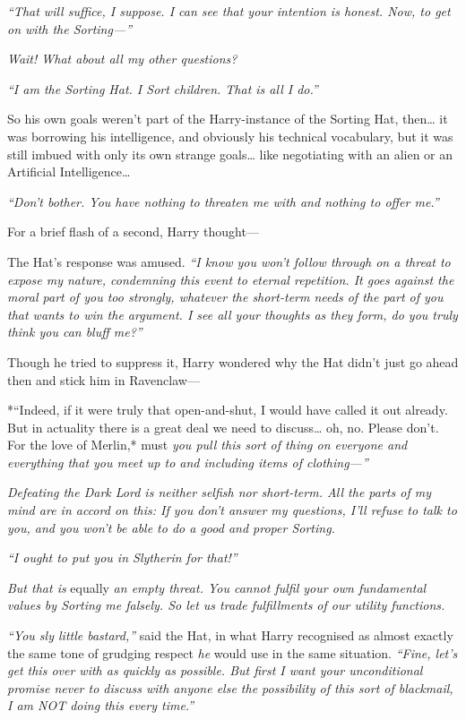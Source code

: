 \emph{``That will suffice, I suppose. I can see that your intention is
honest. Now, to get on with the Sorting---''}

\emph{Wait! What about all my other questions?}

\emph{``I am the Sorting Hat. I Sort children. That is all I do.''}

So his own goals weren't part of the Harry-instance of the Sorting Hat,
then\ldots{} it was borrowing his intelligence, and obviously his
technical vocabulary, but it was still imbued with only its own strange
goals\ldots{} like negotiating with an alien or an Artificial
Intelligence\ldots{}

\emph{``Don't bother. You have nothing to threaten me with and nothing
to offer me.''}

For a brief flash of a second, Harry thought---

The Hat's response was amused. \emph{``I know you won't follow through
on a threat to expose my nature, condemning this event to eternal
repetition. It goes against the moral part of you too strongly, whatever
the short-term needs of the part of you that wants to win the argument.
I see all your thoughts as they form, do you truly think you can bluff
me?''}

Though he tried to suppress it, Harry wondered why the Hat didn't just
go ahead then and stick him in Ravenclaw---

*``Indeed, if it were truly that open-and-shut, I would have called it
out already. But in actuality there is a great deal we need to
discuss\ldots{} oh, no. Please don't. For the love of Merlin,* must
\emph{you pull this sort of thing on everyone and everything that you
meet up to and including items of clothing---''}

\emph{Defeating the Dark Lord is neither selfish nor short-term. All the
parts of my mind are in accord on this: If you don't answer my
questions, I'll refuse to talk to you, and you won't be able to do a
good and proper Sorting.}

\emph{``I ought to put you in Slytherin for that!''}

\emph{But that is} equally \emph{an empty threat. You cannot fulfil your
own fundamental values by Sorting me falsely. So let us trade
fulfillments of our utility functions.}

\emph{``You sly little bastard,''} said the Hat, in what Harry
recognised as almost exactly the same tone of grudging respect \emph{he}
would use in the same situation. \emph{``Fine, let's get this over with
as quickly as possible. But first I want your unconditional promise
never to discuss with anyone else the possibility of this sort of
blackmail, I am NOT doing this every time.''}

